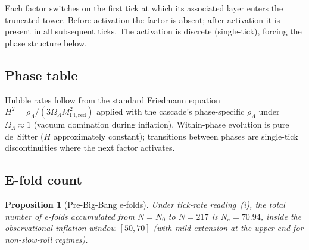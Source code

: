 \documentclass[12pt,a4paper]{article}
\newtheorem{proposition}[theorem]{Proposition}
\begin{document}
Each factor switches on the first tick at which its associated layer enters the
truncated tower. Before activation the factor is absent; after activation it is
present in all subsequent ticks. The activation is discrete (single-tick),
forcing the phase structure below.

\subsection{Phase table}

\begin{center}
\renewcommand{\arraystretch}{1.3}
\end{center}

Hubble rates follow from the standard Friedmann equation
$H^2 = \rho_\Lambda / (3 \Omega_\Lambda M_{\mathrm{Pl,red}}^2)$ applied with the
cascade's phase-specific $\rho_\Lambda$ under $\Omega_\Lambda \approx 1$ (vacuum
domination during inflation). Within-phase evolution is pure de~Sitter
($H$ approximately constant); transitions between phases are single-tick
discontinuities where the next factor activates.

\subsection{E-fold count}

\begin{proposition}[Pre-Big-Bang e-folds]\label{prop:efolds}
Under tick-rate reading~(i), the total number of e-folds accumulated from
$N = N_0$ to $N = 217$ is $N_e = 70.94$, inside the observational inflation
window $[50, 70]$ (with mild extension at the upper end for non-slow-roll
regimes).
\end{proposition}
\end{document}

